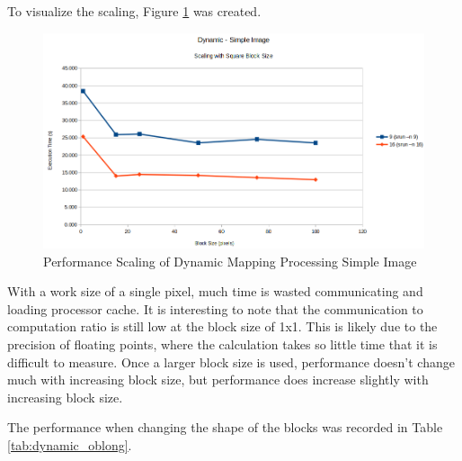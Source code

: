 \documentclass[11pt]{article}
\begin{document}
		
		To visualize the scaling, Figure \ref{fig:dynamic-simple} was created.
	
		\begin{figure}[H]
			\centering
			\includegraphics[width=0.7\linewidth]{"Pictures/Dynamic Simple"}
			\caption{Performance Scaling of Dynamic Mapping Processing Simple Image}
			\label{fig:dynamic-simple}
		\end{figure}
	
		With a work size of a single pixel, much time is wasted communicating and loading processor cache. It is interesting to note that the communication to computation ratio is still low at the block size of 1x1. This is likely due to the precision of floating points, where the calculation takes so little time that it is difficult to measure. Once a larger block size is used, performance doesn't change much with increasing block size, but performance does increase slightly with increasing block size.
		
		The performance when changing the shape of the blocks was recorded in Table \ref{tab:dynamic_oblong}.
	
\end{document}
